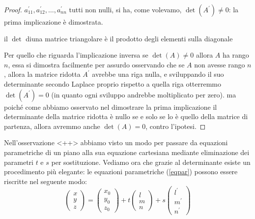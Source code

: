 \begin{teorema}
\begin{proof}
    $a^\prime_{11},a_{12}^\prime,\dots, a_{nn}^\prime$ tutti non nulli, si ha, come volevamo,
    $\det(A^\prime)\neq 0$: la prima implicazione è dimostrata.
    \begin{osservazione}
      il $\det$ diuna matrice triangolare è il prodotto degli elementi sulla diagonale
    \end{osservazione}
    Per quello che riguarda l'implicazione inversa se $\det (A)\neq 0$ allora $A$ ha rango $n$,
    essa si dimostra facilmente per assurdo osservando che se $A$ non avesse rango $n$, allora
    la matrice ridotta $A^\prime$ avrebbe una riga nulla, e sviluppando il suo determinante
    secondo Laplace proprio rispetto a quella riga otterremmo $\det(A^\prime) = 0$ (in quanto ogni
    sviluppo andrebbe moltiplicato per zero). ma poiché come abbiamo osservato nel dimostrare la
    prima implicazione il determinante della matrice ridotta è nullo se e solo se lo è quello
    della matrice di partenza, allora avremmo anche $\det(A)=0$, contro l'ipotesi.
  \end{proof}
  \begin{osservazione}
    Nell'osservazione <++> abbiamo visto un modo per passare da equazioni parametriche di un
    piano alla sua equazione cartesiana mediante eliminazione dei parametri $t$ e $s$ per
    sostituzione. Vediamo ora che grazie al determinante esiste un procedimento più elegante:
    le equazioni parametriche (\ref{eqpar}) possono essere riscritte nel seguente modo:
    \begin{equation*}
      \begin{pmatrix}
        x\\
        y\\
        z
      \end{pmatrix}
      =\begin{pmatrix}
         x_0\\
         y_0\\
         z_0
       \end{pmatrix}
       +t\begin{pmatrix}
           l\\
           m\\
           n
         \end{pmatrix}
         +s\begin{pmatrix}
            l^\prime\\
            m^\prime\\
            n^\prime
          \end{pmatrix}
    \end{equation*}

\end{osservazione}
\end{teorema}
